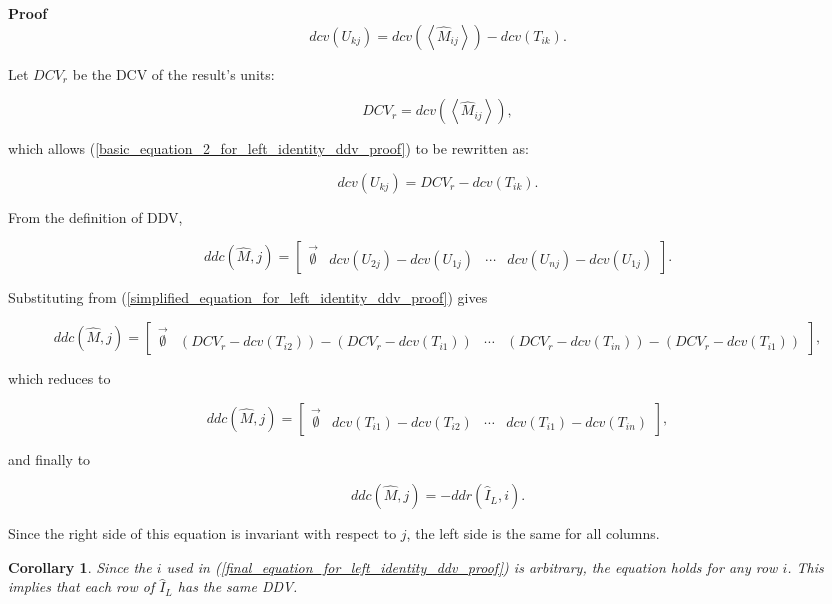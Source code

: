 \documentclass[10pt,letterpaper]{article}
\newtheorem{cor}{Corollary}[section]
\newenvironment{proof}{\noindent\textbf{Proof} }{\qed \newline}
\newcommand{\qed}{\nobreak \ifvmode \relax \else
      \ifdim\lastskip<1.5em \hskip-\lastskip
      \hskip1.5em plus0em minus0.5em \fi \nobreak
      \vrule height0.75em width0.5em depth0.25em\fi}
\numberwithin{equation}{section}
\begin{document}
\begin{proof}
\begin{equation} \label{basic_equation_2_for_left_identity_ddv_proof} dcv(U_{kj}) = dcv( \left\langle \hat M_{ij} \right\rangle ) - dcv(T_{ik}) . \end{equation}

Let $DCV_r$ be the DCV of the result's units:

\[ DCV_r = dcv( \left\langle \hat M_{ij} \right\rangle ) , \]

which allows (\ref{basic_equation_2_for_left_identity_ddv_proof}) to be rewritten as:

\begin{equation} \label{simplified_equation_for_left_identity_ddv_proof} dcv(U_{kj}) = DCV_r - dcv(T_{ik}) . \end{equation}

From the definition of DDV,

\[ ddc(\hat M, j) = \left[ \begin{matrix} \vec{\emptyset} & dcv(U_{2j}) - dcv(U_{1j}) & \cdots & dcv(U_{nj}) - dcv(U_{1j}) \end{matrix} \right] . \]

Substituting from (\ref{simplified_equation_for_left_identity_ddv_proof}) gives

\[ ddc(\hat M, j) = \left[ \begin{matrix} \vec{\emptyset} & (DCV_r - dcv(T_{i2})) - (DCV_r - dcv(T_{i1})) & \cdots & (DCV_r - dcv(T_{in})) - (DCV_r - dcv(T_{i1})) \end{matrix} \right] , \]

which reduces to

\[ ddc(\hat M, j) = \left[ \begin{matrix} \vec{\emptyset} & dcv(T_{i1}) - dcv(T_{i2}) & \cdots & dcv(T_{i1}) - dcv(T_{in}) \end{matrix} \right] , \]

and finally to

\begin{equation} \label{final_equation_for_left_identity_ddv_proof} ddc(\hat M, j) = -ddr(\hat I_L, i) . \end{equation} 

Since the right side of this equation is invariant with respect to $j$, the left side is the same for all columns. \end{proof}

\begin{cor}Since the $i$ used in (\ref{final_equation_for_left_identity_ddv_proof}) is arbitrary, the equation holds for any row $i$.  This implies that each row of $\hat I_L$ has the same DDV.\end{cor}
\end{document}
